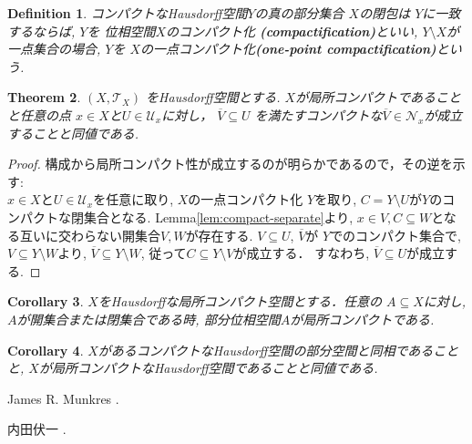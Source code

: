\documentclass[dvipdfmx]{jbook}
\newcommand{\cl}[1]{\overline{ #1}  }
\newtheorem{theorem}{Theorem}[section]
\newtheorem{corollary}[theorem]{Corollary}
\newtheorem{definition}[theorem]{Definition}
\theoremstyle{remark}
\theoremstyle{plain}
\begin{document}
\begin{definition}
	コンパクトなHausdorff空間$Y$の真の部分集合 $X$の閉包は $Y$に一致するならば, 
	$Y$を 位相空間$X$のコンパクト化 \textbf{(compactification)}といい, 
	$Y \setminus X$が一点集合の場合,
	$Y$を $X$の一点コンパクト化\textbf{(one-point compactification)}という.
\end{definition}



\begin{theorem}
	$\left( X , \mathcal{T}_{X} \right)$ をHausdorff空間とする. 
	$X$が局所コンパクトであることと任意の点 $x \in X$と$U \in \mathcal{U}_x$に対し，
	$\overline{V} \subseteq U$ を満たすコンパクトな$\overline{V} \in  \mathcal{N}_x$が成立することと同値である.
\end{theorem}

\begin{proof}
	構成から局所コンパクト性が成立するのが明らかであるので，その逆を示す:\\
	$x \in X$と$U \in \mathcal{U}_x$を任意に取り, $X$の一点コンパクト化 $Y$を取り, 
	$C = Y \setminus U$が$Y$のコンパクトな閉集合となる. 
	Lemma\ref{lem:compact-separate}より,
	$x \in V, C \subseteq W $となる互いに交わらない開集合$V ,W$が存在する. 
	$V \subseteq U$, $\cl{V}$が $Y$でのコンパクト集合で, 
	$V \subseteq Y \setminus W$より, 
	$\cl{V} \subseteq Y \setminus W$,
	従って$C \subseteq Y \setminus V$が成立する． 
	すなわち, $\cl{V} \subseteq U$が成立する.
\end{proof}

\begin{corollary}
	$X$をHausdorffな局所コンパクト空間とする．任意の $A \subseteq X$に対し, $A$が開集合または閉集合である時, 部分位相空間$A$が局所コンパクトである.
\end{corollary}

\begin{corollary}
	$X$があるコンパクトなHausdorff空間の部分空間と同相であることと,  $X$が局所コンパクトなHausdorff空間であることと同値である.
\end{corollary}





\begin{thebibliography}{99}
	 James R. Munkres 
	.

	 内田伏一 
	.
\end{thebibliography}
\end{document}
